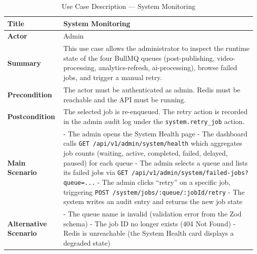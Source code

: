 \begin{table}[H]
\centering
\renewcommand{\arraystretch}{1.4}
\begin{tabular}{|p{4cm}|p{10cm}|}
\hline
\textbf{Title} & System Monitoring \\ \hline

\textbf{Actor} & Admin \\ \hline

\textbf{Summary} &
This use case allows the administrator to inspect the runtime state of the four BullMQ queues (post-publishing, video-processing, analytics-refresh, ai-processing), browse failed jobs, and trigger a manual retry. \\ \hline

\textbf{Precondition} &
The actor must be authenticated as admin. Redis must be reachable and the API must be running. \\ \hline

\textbf{Postcondition} &
The selected job is re-enqueued. The retry action is recorded in the admin audit log under the \texttt{system.retry\_job} action. \\ \hline

\textbf{Main Scenario} &
- The admin opens the System Health page \newline
- The dashboard calls \texttt{GET /api/v1/admin/system/health} which aggregates job counts (waiting, active, completed, failed, delayed, paused) for each queue \newline
- The admin selects a queue and lists its failed jobs via \texttt{GET /api/v1/admin/system/failed-jobs?queue=...} \newline
- The admin clicks ``retry'' on a specific job, triggering \texttt{POST /system/jobs/:queue/:jobId/retry} \newline
- The system writes an audit entry and returns the new job state \\ \hline

\textbf{Alternative Scenario} &
- The queue name is invalid (validation error from the Zod schema) \newline
- The job ID no longer exists (404 Not Found) \newline
- Redis is unreachable (the System Health card displays a degraded state) \\ \hline

\end{tabular}
\caption{Use Case Description --- System Monitoring}
\label{tab:system-monitoring}
\end{table}


